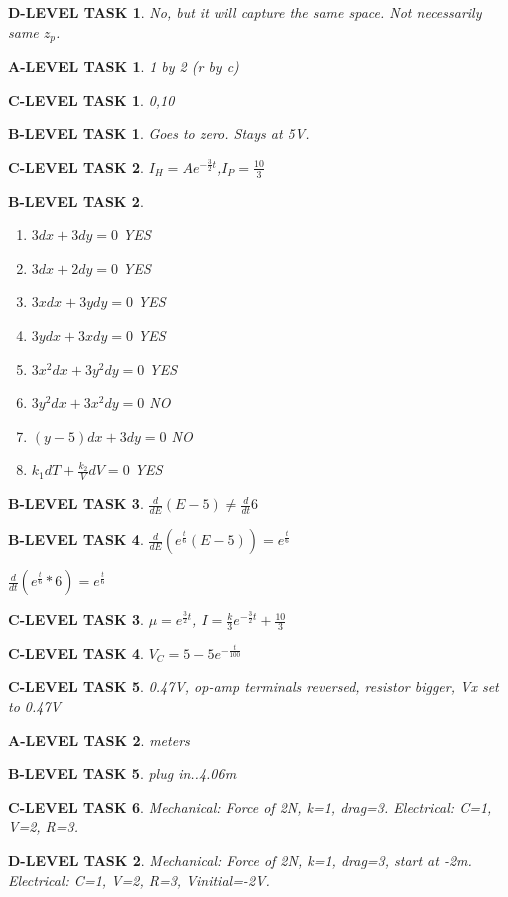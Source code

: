 \documentclass{book}
\numberwithin{equation}{section}
\newtheorem{alevel}{A-LEVEL TASK}
\newtheorem{blevel}{B-LEVEL TASK}
\newtheorem{clevel}{C-LEVEL TASK}
\newtheorem{dlevel}{D-LEVEL TASK}
\theoremstyle{definition}
\begin{document}
\begin{dlevel}No, but it will capture the same space. Not necessarily same $z_p$. \end{dlevel}
\begin{alevel}1 by 2 (r by c)\end{alevel}
\begin{clevel}0,10\end{clevel}
\begin{blevel}Goes to zero. Stays at 5V.\end{blevel}
\begin{clevel}$I_H=Ae^{-\frac{3}{2}t}$,$I_P=\frac{10}{3}$\end{clevel}

\begin{blevel}
\begin{enumerate}
\item $3dx + 3dy = 0$  YES
\item $3dx + 2dy = 0$  YES
\item $3xdx + 3ydy = 0$  YES
\item $3ydx + 3xdy = 0$  YES
\item $3x^2dx + 3y^2dy = 0$  YES
\item $3y^2dx + 3x^2dy = 0$  NO
\item $(y-5)dx + 3dy = 0$  NO
\item $k_1dT+\frac{k_2}{V}dV=0$  YES
\end{enumerate}\end{blevel}

\begin{blevel}$\frac{d}{dE}(E-5) \neq \frac{d}{dt}6$\end{blevel}
\begin{blevel}$\frac{d}{dE}(e^{\frac{t}{6}}(E-5))=e^{\frac{t}{6}}$\par
$\frac{d}{dt}(e^{\frac{t}{6}}*6)=e^{\frac{t}{6}}$\end{blevel}

\begin{clevel}$\mu=e^{\frac{3}{2}t}$, $I=\frac{k}{3}e^{-\frac{3}{2}t}+\frac{10}{3}$\end{clevel}

\begin{clevel}$V_C=5-5e^{-\frac{t}{100}}$\end{clevel}
\begin{clevel}0.47V, op-amp terminals reversed, resistor bigger, Vx set to 0.47V\end{clevel}
\begin{alevel}meters\end{alevel}
\begin{blevel}plug in..4.06m\end{blevel}
\begin{clevel}Mechanical: Force of 2N, k=1, drag=3. Electrical: C=1, V=2, R=3.\end{clevel}
\begin{dlevel}Mechanical: Force of 2N, k=1, drag=3, start at -2m. Electrical: C=1, V=2, R=3, Vinitial=-2V.\end{dlevel}
\end{document}
